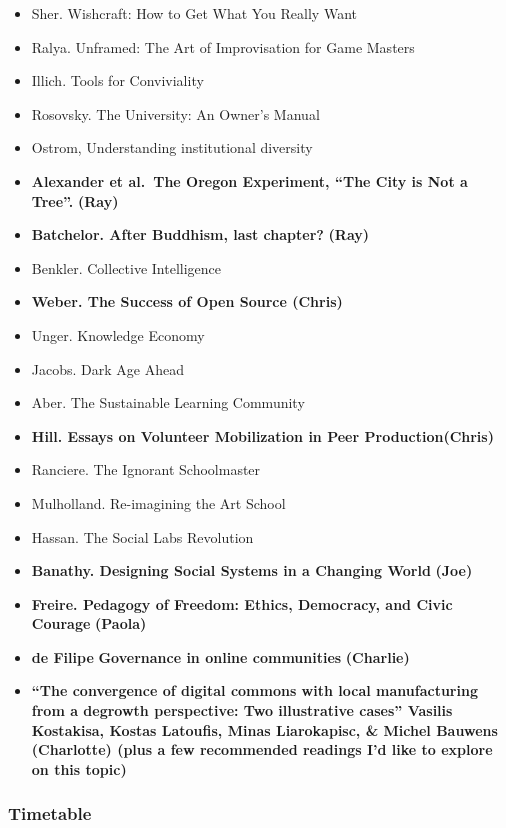 \begin{itemize}
\tightlist
\item
  Sher. Wishcraft: How to Get What You Really Want
\item
  Ralya. Unframed: The Art of Improvisation for Game Masters
\item
  Illich. Tools for Conviviality
\item
  Rosovsky. The University: An Owner's Manual
\item
  Ostrom, Understanding institutional diversity
\item
  \textbf{Alexander et al.~The Oregon Experiment, ``The City is Not a
  Tree''.} \textbf{(Ray)}
\item
  \textbf{Batchelor. After Buddhism, last chapter?} \textbf{(Ray)}
\item
  Benkler. Collective Intelligence
\item
  \textbf{Weber. The Success of Open Source (Chris)}
\item
  Unger. Knowledge Economy
\item
  Jacobs. Dark Age Ahead
\item
  Aber. The Sustainable Learning Community
\item
  \textbf{Hill. Essays on Volunteer Mobilization in Peer
  Production(Chris)}
\item
  Ranciere. The Ignorant Schoolmaster
\item
  Mulholland. Re-imagining the Art School
\item
  Hassan. The Social Labs Revolution
\item
  \textbf{Banathy. Designing Social Systems in a Changing World}
  \textbf{(Joe)}
\item
  \textbf{Freire. Pedagogy of Freedom: Ethics, Democracy, and Civic
  Courage} \textbf{(Paola)}
\item
  \textbf{de Filipe} \textbf{Governance in online communities}
  \textbf{(Charlie)}
\item
  \textbf{``The convergence of digital commons with local manufacturing
  from a degrowth perspective: Two illustrative cases'' Vasilis
  Kostakisa, Kostas Latoufis, Minas Liarokapisc, \& Michel Bauwens
  (Charlotte) (plus a few recommended readings I'd like to explore on
  this topic)}
\end{itemize}

\hypertarget{timetable}{%
\subsubsection{Timetable}\label{timetable}}

